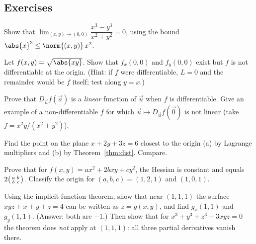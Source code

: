 \subsection*{Exercises}
\begin{exercise}
Show that $\lim_{(x,y)\to(0,0)}\dfrac{x^3-y^3}{x^2+y^2}=0$, using the bound $\abs{x}^3\le\norm{(x,y)}\,x^2$.
\end{exercise}
\begin{exercise}
Let $f(x,y)=\sqrt{\abs{xy}}$. Show that $f_x(0,0)$ and $f_y(0,0)$ exist but $f$ is not differentiable at the origin. (Hint: if $f$ were differentiable, $L=0$ and the remainder would be $f$ itself; test along $y=x$.)
\end{exercise}
\begin{exercise}
Prove that $D_{\vec u}f(\vec a)$ is a \emph{linear} function of $\vec u$ when $f$ is differentiable. Give an example of a non-differentiable $f$ for which $\vec u\mapsto D_{\vec u}f(\vec 0)$ is not linear (take $f=x^2y/(x^2+y^2)$).
\end{exercise}
\begin{exercise}
Find the point on the plane $x+2y+3z=6$ closest to the origin (a) by Lagrange multipliers and (b) by Theorem~\ref{thm:dist}. Compare.
\end{exercise}
\begin{exercise}
Prove that for $f(x,y)=ax^2+2bxy+cy^2$, the Hessian is constant and equals $2\begin{psmallmatrix}a&b\\b&c\end{psmallmatrix}$. Classify the origin for $(a,b,c)=(1,2,1)$ and $(1,0,1)$.
\end{exercise}
\begin{exercise}
Using the implicit function theorem, show that near $(1,1,1)$ the surface $xyz+x+y+z=4$ can be written as $z=g(x,y)$, and find $g_x(1,1)$ and $g_y(1,1)$. (Answer: both are $-1$.) Then show that for $x^3+y^3+z^3-3xyz=0$ the theorem does \emph{not} apply at $(1,1,1)$: all three partial derivatives vanish there.
\end{exercise}
